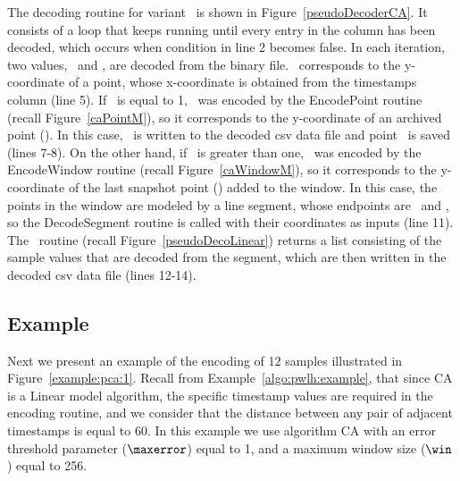 





\vspace{+10pt}
The decoding routine for variant \maskalgo\ is shown in Figure~\ref{pseudoDecoderCA}. It consists of a loop that keeps running until every entry in the column has been decoded, which occurs when condition in line 2 becomes false. In each iteration, two values, \sizee\ and , are decoded from the binary file. \ corresponds to the y-coordinate of a point, whose x-coordinate is obtained from the timestamps column (line 5). If \sizee\ is equal to 1, \ was encoded by the EncodePoint routine (recall Figure~\ref{caPointM}), so it corresponds to the y-coordinate of an archived point (\archived). In this case, \ is written to the decoded csv data file and point \archived\ is saved (lines 7-8). On the other hand, if \sizee\ is greater than one, \ was encoded by the EncodeWindow routine (recall Figure~\ref{caWindowM}), so it corresponds to the y-coordinate of the last snapshot point (\snapshot) added to the window. In this case, the points in the window are modeled by a line segment, whose endpoints are \archived\ and \snapshot, so the DecodeSegment routine is called with their coordinates as inputs (line 11). The \decodeSegment\ routine (recall Figure~\ref{pseudoDecoLinear}) returns a list consisting of the sample values that are decoded from the segment, which are then written in the decoded csv data file (lines 12-14).


\clearpage







\subsection{Example}
\label{algo:ca:example}


Next we present an example of the encoding of 12 samples illustrated in Figure~\ref{example:pca:1}. Recall from Example~\ref{algo:pwlh:example}, that since CA is a Linear model algorithm, the specific timestamp values are required in the encoding routine, and we consider that the distance between any pair of adjacent timestamps is equal to 60. In this example we use algorithm CA with an error threshold parameter ($\maxerror$) equal to 1, and a maximum window size ($\win$) equal to 256.


